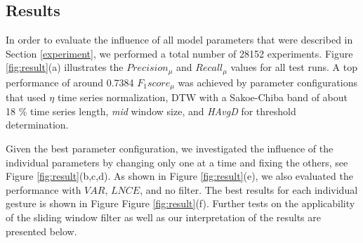 \subsection{Results} \label{results}

In order to evaluate the influence of all model parameters that were described in Section \ref{experiment}, we performed a total number of 28152 experiments.
Figure \ref{fig:result}(a) illustrates the $Precision_{\mu}$ and $Recall_{\mu}$ values for all test runs.
A top performance of around 0.7384 $F_{1}score_{\mu}$ was achieved by parameter configurations that
used $\eta$ time series normalization, DTW with a Sakoe-Chiba band of about 18 \% time series length, \textit{mid} window size, and \textit{HAvgD} for threshold determination.

Given the best parameter configuration, we investigated the influence of the individual parameters by changing only one at a time and fixing the others, see Figure \ref{fig:result}(b,c,d).
As shown in Figure \ref{fig:result}(e), we also evaluated the performance with $VAR$, $LNCE$, and no filter.
The best results for each individual gesture is shown in Figure Figure \ref{fig:result}(f).
Further tests on the applicability of the sliding window filter as well as our interpretation of the results are presented below.


